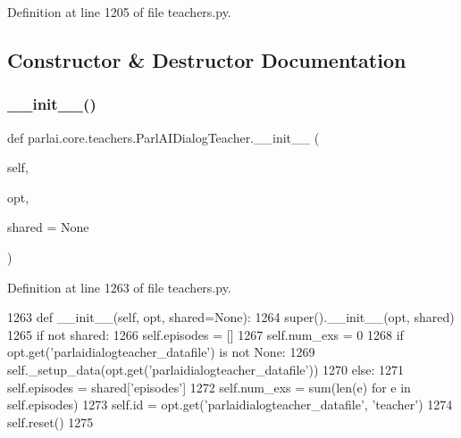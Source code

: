 Definition at line 1205 of file teachers.\+py.



\subsection{Constructor \& Destructor Documentation}
\mbox{\label{classparlai_1_1core_1_1teachers_1_1ParlAIDialogTeacher_ad79a47d28e60c24df72b8523aff6b247}} 
\subsubsection{\texorpdfstring{\+\_\+\+\_\+init\+\_\+\+\_\+()}{\_\_init\_\_()}}
{\footnotesize\ttfamily def parlai.\+core.\+teachers.\+Parl\+A\+I\+Dialog\+Teacher.\+\_\+\+\_\+init\+\_\+\+\_\+ (\begin{DoxyParamCaption}\item[{}]{self,  }\item[{}]{opt,  }\item[{}]{shared = {\ttfamily None} }\end{DoxyParamCaption})}



Definition at line 1263 of file teachers.\+py.


\begin{DoxyCode}
1263     \textcolor{keyword}{def }\_\_init\_\_(self, opt, shared=None):
1264         super().\_\_init\_\_(opt, shared)
1265         \textcolor{keywordflow}{if} \textcolor{keywordflow}{not} shared:
1266             self.episodes = []
1267             self.num\_exs = 0
1268             \textcolor{keywordflow}{if} opt.get(\textcolor{stringliteral}{'parlaidialogteacher\_datafile'}) \textcolor{keywordflow}{is} \textcolor{keywordflow}{not} \textcolor{keywordtype}{None}:
1269                 self.\_setup\_data(opt.get(\textcolor{stringliteral}{'parlaidialogteacher\_datafile'}))
1270         \textcolor{keywordflow}{else}:
1271             self.episodes = shared[\textcolor{stringliteral}{'episodes'}]
1272             self.num\_exs = sum(len(e) \textcolor{keywordflow}{for} e \textcolor{keywordflow}{in} self.episodes)
1273         self.id = opt.get(\textcolor{stringliteral}{'parlaidialogteacher\_datafile'}, \textcolor{stringliteral}{'teacher'})
1274         self.reset()
1275 
\end{DoxyCode}


